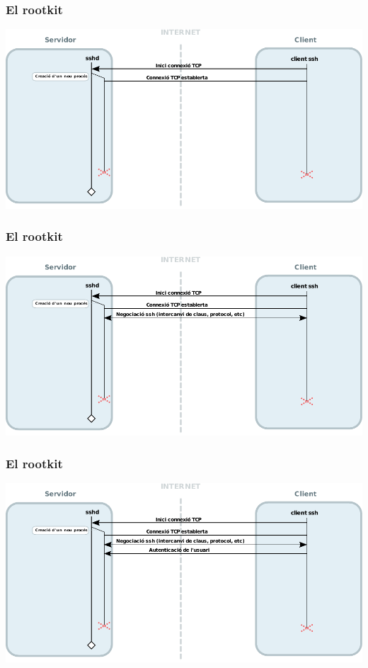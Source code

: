 \documentclass{beamer}
\begin{document}
\begin{frame}
	\frametitle{El rootkit}
	\includegraphics[scale=0.65,keepaspectratio]{sshd_3.pdf}
\end{frame}

\begin{frame}
	\frametitle{El rootkit}
	\includegraphics[scale=0.65,keepaspectratio]{sshd_4.pdf}
\end{frame}

\begin{frame}
	\frametitle{El rootkit}
	\includegraphics[scale=0.65,keepaspectratio]{sshd_5.pdf}
\end{frame}
\end{document}
